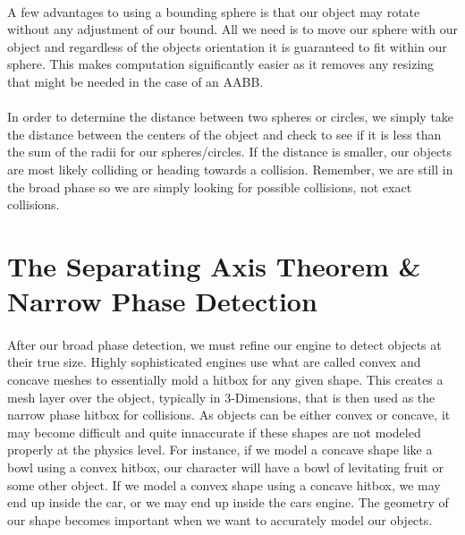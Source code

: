 \documentclass[12pt, letterpaper]{report}
\begin{document}
	\paragraph{} A few advantages to using a bounding sphere is that our object may rotate without any adjustment of our bound. All we need is to move our sphere with our object and regardless of the objects orientation it is guaranteed to fit within our sphere. This makes computation significantly easier as it removes any resizing that might be needed in the case of an AABB. 
	\paragraph{} In order to determine the distance between two spheres or circles, we simply take the distance between the centers of the object and check to see if it is less than the sum of the radii for our spheres/circles. If the distance is smaller, our objects are most likely colliding or heading towards a collision. Remember, we are still in the broad phase so we are simply looking for possible collisions, not exact collisions.
	\section{The Separating Axis Theorem \& Narrow Phase Detection}
	\paragraph{} After our broad phase detection, we must refine our engine to detect objects at their true size. Highly sophisticated engines use what are called convex and concave meshes to essentially mold a hitbox for any given shape. This creates a mesh layer over the object, typically in 3-Dimensions, that is then used as the narrow phase hitbox for collisions. As objects can be either convex or concave, it may become difficult and quite innaccurate if these shapes are not modeled properly at the physics level. For instance, if we model a concave shape like a bowl using a convex hitbox, our character will have a bowl of levitating fruit or some other object. If we model a convex shape using a concave hitbox, we may end up inside the car, or we may end up inside the cars engine. The geometry of our shape becomes important when we want to accurately model our objects. 
\end{document}
